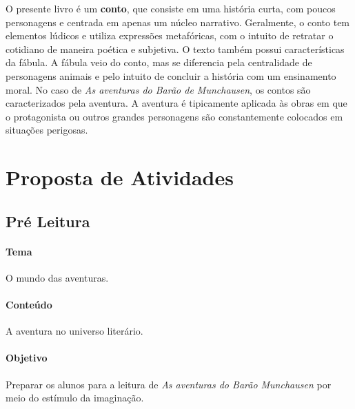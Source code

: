 \documentclass[11pt]{extarticle}
\begin{document}
O presente livro é um \textbf{conto}, que consiste em uma história curta, com poucos personagens e centrada em apenas um núcleo narrativo. Geralmente, o conto tem elementos lúdicos e utiliza expressões metafóricas, com o intuito de retratar o cotidiano de maneira poética e subjetiva. O texto também possui características da fábula. A fábula veio do conto, mas se diferencia pela centralidade de personagens animais e pelo intuito de concluir a história com um ensinamento moral. No caso de \textit{As aventuras do Barão de Munchausen}, os contos são caracterizados pela aventura. A aventura é tipicamente aplicada às obras em que o protagonista ou outros grandes personagens são constantemente colocados em situações perigosas. 


\section{Proposta de Atividades}
\subsection{Pré Leitura}


\paragraph{Tema} O mundo das aventuras.  

\paragraph{Conteúdo} A aventura no universo literário. 

\paragraph{Objetivo} Preparar os alunos para a leitura de \textit{As aventuras do Barão Munchausen} por meio do estímulo da imaginação.
\end{document}

